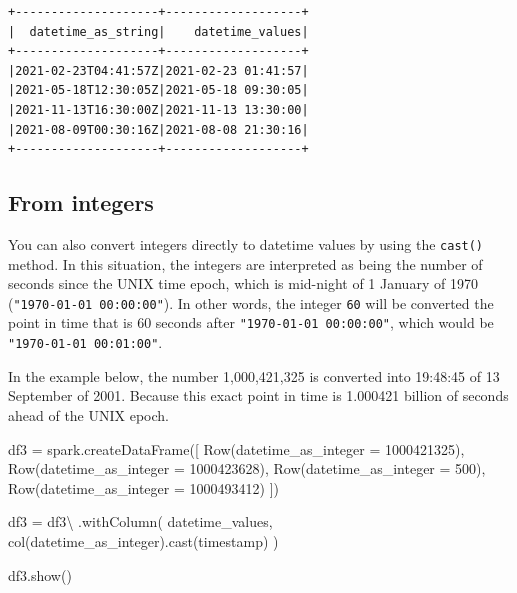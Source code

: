 \documentclass[
  11pt,
  letterpaper,
  DIV=11,
  numbers=noendperiod]{scrreprt}
\newenvironment{Shaded}{\begin{snugshade}}{\end{snugshade}}
\newcommand{\DecValTok}[1]{\textcolor[rgb]{0.68,0.00,0.00}{#1}}
\newcommand{\NormalTok}[1]{\textcolor[rgb]{0.00,0.23,0.31}{#1}}
\newcommand{\OperatorTok}[1]{\textcolor[rgb]{0.37,0.37,0.37}{#1}}
\newcommand{\StringTok}[1]{\textcolor[rgb]{0.13,0.47,0.30}{#1}}
\begin{document}
\begin{verbatim}
+--------------------+-------------------+
|  datetime_as_string|    datetime_values|
+--------------------+-------------------+
|2021-02-23T04:41:57Z|2021-02-23 01:41:57|
|2021-05-18T12:30:05Z|2021-05-18 09:30:05|
|2021-11-13T16:30:00Z|2021-11-13 13:30:00|
|2021-08-09T00:30:16Z|2021-08-08 21:30:16|
+--------------------+-------------------+
\end{verbatim}

\hypertarget{from-integers}{%
\subsection{From integers}\label{from-integers}}

You can also convert integers directly to datetime values by using the
\texttt{cast()} method. In this situation, the integers are interpreted
as being the number of seconds since the UNIX time epoch, which is
mid-night of 1 January of 1970 (\texttt{"1970-01-01\ 00:00:00"}). In
other words, the integer \texttt{60} will be converted the point in time
that is 60 seconds after \texttt{"1970-01-01\ 00:00:00"}, which would be
\texttt{"1970-01-01\ 00:01:00"}.

In the example below, the number 1,000,421,325 is converted into
19:48:45 of 13 September of 2001. Because this exact point in time is
1.000421 billion of seconds ahead of the UNIX epoch.

\begin{Shaded}
\begin{Highlighting}[]
\NormalTok{df3 }\OperatorTok{=}\NormalTok{ spark.createDataFrame([}
\NormalTok{    Row(datetime\_as\_integer }\OperatorTok{=} \DecValTok{1000421325}\NormalTok{),}
\NormalTok{    Row(datetime\_as\_integer }\OperatorTok{=} \DecValTok{1000423628}\NormalTok{),}
\NormalTok{    Row(datetime\_as\_integer }\OperatorTok{=} \DecValTok{500}\NormalTok{),}
\NormalTok{    Row(datetime\_as\_integer }\OperatorTok{=} \DecValTok{1000493412}\NormalTok{)}
\NormalTok{])}

\NormalTok{df3 }\OperatorTok{=}\NormalTok{ df3}\OperatorTok{\textbackslash{}}
\NormalTok{    .withColumn(}
        \StringTok{\textquotesingle{}datetime\_values\textquotesingle{}}\NormalTok{,}
\NormalTok{        col(}\StringTok{\textquotesingle{}datetime\_as\_integer\textquotesingle{}}\NormalTok{).cast(}\StringTok{\textquotesingle{}timestamp\textquotesingle{}}\NormalTok{)}
\NormalTok{    )}

\NormalTok{df3.show()}
\end{Highlighting}
\end{Shaded}
\end{document}
